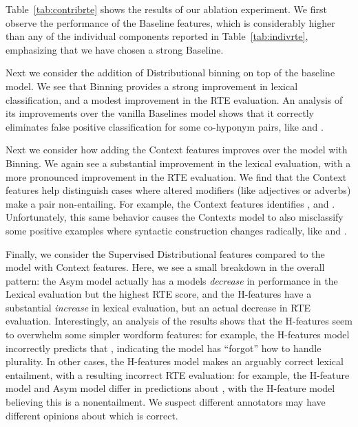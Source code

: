 Table~\ref{tab:contribrte} shows the results of our ablation experiment. We
first observe the performance of the Baseline features, which is considerably
higher than any of the individual components reported in
Table~\ref{tab:indivrte}, emphasizing that we have chosen a strong Baseline.

Next we consider the addition of Distributional binning on top of the baseline
model. We see that Binning provides a strong improvement in lexical
classification, and a modest improvement in the RTE evaluation. An analysis
of its improvements over the vanilla Baselines model shows that it correctly
eliminates false positive classification for some co-hyponym pairs, like
 and .

Next we consider how adding the Context features improves over the model
with Binning. We again see a substantial improvement in the lexical evaluation,
with a more pronounced improvement in the RTE evaluation. We find that the
Context features help distinguish cases where altered modifiers (like adjectives
or adverbs) make a pair non-entailing.
For example, the Context features identifies , and . Unfortunately, this
same behavior causes the Contexts model to also misclassify
some positive examples where syntactic
construction changes radically, like  and .

Finally, we consider the Supervised Distributional features compared to the
model with Context features. Here, we see a small breakdown in the overall
pattern: the Asym model actually has a models {\em decrease} in performance
in the Lexical evaluation but the highest RTE score, and the H-features have
a substantial {\em increase} in lexical evaluation, but an actual decrease
in RTE evaluation. Interestingly, an analysis of the results shows that the
H-features seem to overwhelm some simpler wordform features: for example,
the H-features model incorrectly predicts that ,
indicating the model has ``forgot'' how to handle plurality. In other cases,
the H-features model makes an arguably correct lexical entailment, with
a resulting incorrect RTE evaluation: for example, the H-feature model and Asym
model differ in predictions about , with the
H-feature model believing this is a nonentailment. We suspect different
annotators may have different opinions about which is correct.

